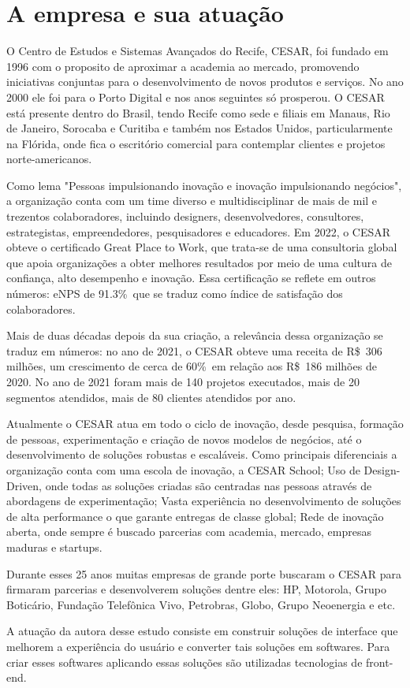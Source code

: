 \section{A empresa e sua atuação }
\label{sec:atuacao}

{O Centro de Estudos e Sistemas Avançados do Recife, CESAR, foi fundado em 1996 com o proposito de aproximar a academia ao mercado, promovendo iniciativas conjuntas para o desenvolvimento de novos produtos e serviços. No ano 2000 ele foi para o Porto Digital e nos anos seguintes só prosperou. O CESAR está presente dentro do Brasil, tendo Recife como sede e filiais em Manaus, Rio de Janeiro, Sorocaba e Curitiba e também nos Estados Unidos, particularmente na Flórida, onde fica o escritório comercial para contemplar clientes e projetos norte-americanos. 

Como lema "Pessoas impulsionando inovação e inovação impulsionando negócios", a organização conta com um time diverso e multidisciplinar de mais de mil e trezentos colaboradores, incluindo designers, desenvolvedores, consultores, estrategistas, empreendedores, pesquisadores e educadores. Em 2022, o CESAR obteve o certificado Great Place to Work, que trata-se de uma consultoria global que apoia organizações a obter melhores resultados por meio de uma cultura de confiança, alto desempenho e inovação. Essa certificação se reflete em outros números: eNPS de 91.3\%\, que se traduz como índice de satisfação dos colaboradores.

Mais de duas décadas depois da sua criação, a relevância dessa organização se traduz em números: no ano de 2021, o CESAR obteve uma receita de R\$\ 306 milhões, um crescimento de cerca de 60\%\ em relação aos R\$\ 186 milhões de 2020. No ano de 2021 foram mais de 140 projetos executados, mais de 20 segmentos atendidos, mais de 80 clientes atendidos por ano.

Atualmente o CESAR atua em todo o ciclo de inovação, desde pesquisa, formação de pessoas, experimentação e criação de novos modelos de negócios, até o desenvolvimento de soluções robustas e escaláveis. Como principais diferenciais a organização conta com uma escola de inovação, a CESAR School; Uso de Design-Driven, onde todas as soluções criadas são centradas nas pessoas através de abordagens de experimentação; Vasta experiência no desenvolvimento de soluções de alta performance o que garante entregas de classe global; Rede de inovação aberta, onde sempre é buscado parcerias com academia, mercado, empresas maduras e startups. 

Durante esses 25 anos muitas empresas de grande porte buscaram o CESAR para firmaram parcerias e desenvolverem soluções dentre eles: HP, Motorola, Grupo Boticário, Fundação Telefônica Vivo, Petrobras, Globo, Grupo Neoenergia e etc. 

A atuação da autora desse estudo consiste em construir soluções de interface que melhorem a experiência do usuário e converter tais soluções em softwares. Para criar esses softwares aplicando essas soluções são utilizadas tecnologias de front-end. 
}